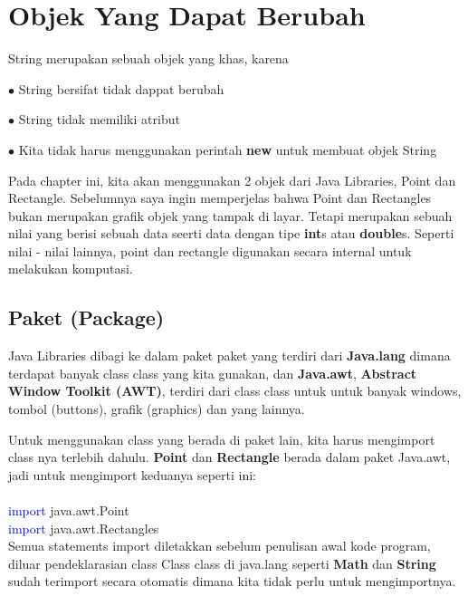 \chapter{Objek Yang Dapat Berubah}
String merupakan sebuah objek yang khas, karena
\begin{description}
	\item{$\bullet$} String bersifat tidak dappat berubah
	\item{$\bullet$} String tidak memiliki atribut
	\item{$\bullet$} Kita tidak harus menggunakan perintah \textbf{new} untuk membuat objek String
\end{description}
Pada chapter ini, kita akan menggunakan 2 objek dari Java Libraries, Point dan Rectangle. Sebelumnya saya ingin memperjelas bahwa Point dan Rectangles bukan merupakan grafik objek yang tampak di layar. Tetapi merupakan sebuah nilai yang berisi sebuah data seerti data dengan tipe \textbf{int}s atau \textbf{double}s. Seperti nilai - nilai lainnya, point dan rectangle digunakan secara internal untuk melakukan komputasi.

\section{Paket (Package)}
Java Libraries dibagi ke dalam paket paket yang terdiri dari \textbf{Java.lang} dimana terdapat banyak class class yang kita gunakan, dan \textbf{Java.awt}, \textbf{Abstract Window Toolkit (AWT)}, terdiri dari class class untuk untuk banyak windows, tombol (buttons), grafik (graphics) dan yang lainnya.

Untuk menggunakan class yang berada di paket lain, kita harus mengimport class nya terlebih dahulu. \textbf{Point} dan \textbf{Rectangle} berada dalam paket Java.awt, jadi untuk mengimport keduanya seperti ini:\\
\\
	\textcolor{blue}{import} java.awt.Point \\
	\textcolor{blue}{import} java.awt.Rectangles \\


Semua statements import diletakkan sebelum penulisan awal kode program, diluar pendeklarasian class
Class class di java.lang seperti \textbf{Math} dan \textbf{String} sudah terimport secara otomatis dimana kita tidak perlu untuk mengimportnya.

